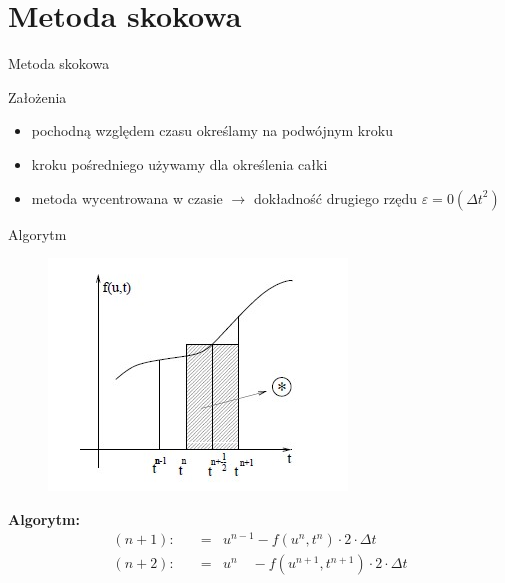 \section{Metoda skokowa}
\begin{frame}{Metoda skokowa}
	\begin{block}{Założenia}
	\begin{itemize}
	\item pochodną względem czasu określamy na podwójnym kroku
    \item kroku pośredniego używamy dla określenia całki
    \item metoda wycentrowana w czasie $\rightarrow $ dokładność drugiego rzędu $\varepsilon = 0({\Delta t}^2)$
	\end{itemize}
	\end{block}
\end{frame}
\begin{frame}{Algorytm}
	\begin{figure}
	\includegraphics[height=0.5\textheight]{img/22/metoda_skokowa.jpg}
	\end{figure}
    \textbf{Algorytm:}
    $$ \begin{array}{rcl}
      (n+1):\quad &=&u^{n-1} -f(u^n,t^n)\cdot 2 \cdot \Delta t\\
      (n+2):\quad &=&u^n \quad -f(u^{n+1},t^{n+1})\cdot 2 \cdot \Delta t
      \end{array} $$
    
\end{frame}

